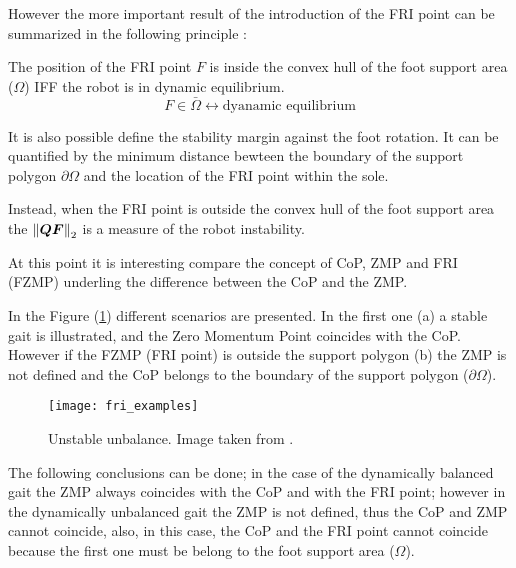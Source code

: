 However the more important result of the introduction of the FRI point can be summarized in the
following principle \cite{Goswami1999}:
\begin{principle}
  The position of the FRI point $F$ is inside the convex hull of the foot support area ($\Omega$)
  IFF the robot is in dynamic equilibrium.
  \[
  F \in \bar{\Omega} \longleftrightarrow \text{dyanamic equilibrium}
  \]
  \par
  It is also possible define the stability margin against the foot rotation.
  It can be  quantified by the minimum distance bewteen the boundary of the support polygon
  $\partial \Omega$ and the location of the FRI point within the sole.
  \par
  Instead, when the FRI point is outside the convex hull of the foot support area the
  $\left\lVert\boldsymbol{QF}\right\rVert_2$ is a measure of the robot instability.
\end{principle}
At this point it is interesting compare the concept of CoP, ZMP and FRI (FZMP)
underling the difference between the CoP and the ZMP.
\par
In the Figure (\ref{fig:fri_example}) different scenarios are presented. In the first one (a) a
stable gait is illustrated, and the Zero Momentum Point coincides with the CoP. However if
the FZMP (FRI point) is outside the support polygon (b) the ZMP is not defined and the CoP belongs
to the boundary of the support polygon ($\partial \Omega$).
\begin{figure}[!ht]
  \centering
  \texttt{[image: fri\_examples]}
  \caption{Unstable unbalance. Image taken from \cite{Vukobratov2004}. \label{fig:fri_example}}
\end{figure}
The following conclusions can be done; in the case of the dynamically balanced gait the ZMP always
coincides with the CoP and with the FRI point;
however in the dynamically unbalanced gait  the ZMP is not defined, thus the CoP and
ZMP cannot coincide, also, in this case, the CoP and the FRI point cannot coincide because the
first one must be belong to the foot support area ($\Omega$).
\newpage
